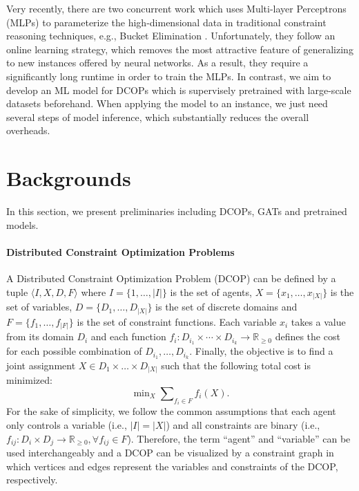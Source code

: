 \documentclass[letterpaper]{article} %
\begin{document}
Very recently, there are two concurrent work \cite{yanchen21,razeghiKLBAD21} which uses Multi-layer Perceptrons (MLPs) to parameterize the high-dimensional data in traditional constraint reasoning techniques, e.g., Bucket Elimination \cite{dechter98}. Unfortunately, they follow an online learning strategy, which removes the most attractive feature of generalizing to new instances offered by neural networks. As a result, they require a significantly long runtime in order to train the MLPs. In contrast, we aim to develop an ML model for DCOPs which is supervisely pretrained with large-scale datasets beforehand. When applying the model to an instance, we just need several steps of model inference, which substantially reduces the overall overheads.

\section{Backgrounds}
In this section, we present preliminaries including DCOPs, GATs and pretrained models.
\paragraph{Distributed Constraint Optimization Problems} A Distributed Constraint Optimization Problem (DCOP) \cite{modi2005adopt} can be defined by a tuple $\langle I,X,D,F\rangle$ where $I=\{1,\dots,|I|\}$ is the set of agents, $X=\{x_1,\dots,x_{|X|}\}$ is the set of variables, $D=\{D_1,\dots,D_{|X|}\}$ is the set of discrete domains and $F=\{f_1,\dots,f_{|F|}\}$ is the set of constraint functions. Each variable $x_i$ takes a value from its domain $D_i$ and each function $f_i:D_{i_1}\times\cdots \times D_{i_k}\rightarrow \mathbb{R}_{\ge 0}$ defines the cost for each possible combination of $D_{i_1},\dots,D_{i_k}$.
Finally, the objective is to find a joint assignment $X\in D_1\times\dots\times D_{|X|}$ such that the following total cost is minimized:
\begin{equation}
\mathop{\min}\nolimits_X\sum\nolimits_{f_i\in F}f_i(X).
\end{equation}
For the sake of simplicity, we follow the common assumptions that each agent only controls a variable (i.e., $|I|=|X|$) and all constraints are binary (i.e., $f_{ij}: D_i\times D_j\rightarrow\mathbb{R}_{\ge 0}, \forall f_{ij}\in F$). Therefore, the term ``agent'' and ``variable'' can be used interchangeably and a DCOP can be visualized by a constraint graph in which vertices and edges represent the variables and constraints of the DCOP, respectively.
\end{document}
